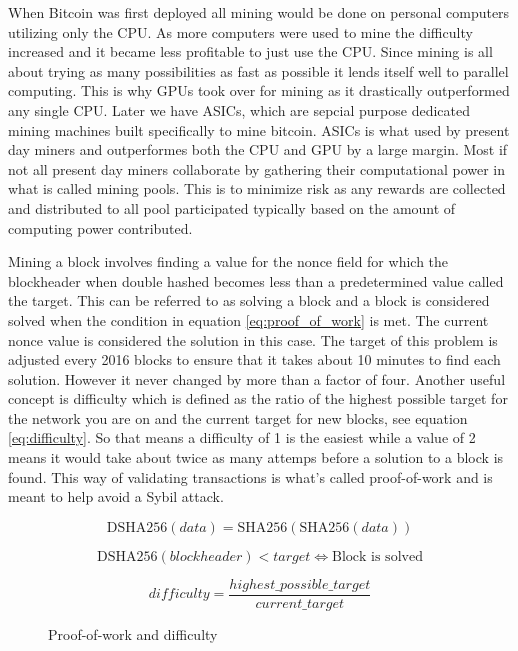 \documentclass[12pt]{article}
\begin{document}
When Bitcoin was first deployed all mining would be done on personal computers utilizing only the CPU. As more computers were used to mine the difficulty increased and it became less profitable to just use the CPU. Since mining is all about trying as many possibilities as fast as possible it lends itself well to parallel computing. This is why GPUs took over for mining as it drastically outperformed any single CPU. Later we have ASICs, which are sepcial purpose dedicated mining machines built specifically to mine bitcoin. ASICs is what used by present day miners and outperformes both the CPU and GPU by a large margin. Most if not all present day miners collaborate by gathering their computational power in what is called mining pools. This is to minimize risk as any rewards are collected and distributed to all pool participated typically based on the amount of computing power contributed. 

Mining a block involves finding a value for the nonce field for which the blockheader when double hashed becomes less than a predetermined value called the target. This can be referred to as solving a block and a block is considered solved when the condition in equation \ref{eq:proof_of_work} is met. The current nonce value is considered the solution in this case. The target of this problem is adjusted every 2016 blocks to ensure that it takes about 10 minutes to find each solution. However it never changed by more than a factor of four\cite{tschorsch2015bitcoin}. Another useful concept is difficulty which is defined as the ratio of the highest possible target for the network you are on and the current target for new blocks, see equation \ref{eq:difficulty}. So that means a difficulty of 1 is the easiest while a value of 2 means it would take about twice as many attemps before a solution to a block is found. This way of validating transactions is what's called proof-of-work and is meant to help avoid a Sybil attack\cite{tschorsch2015bitcoin}.

\begin{figure}[h!]
\begin{equation*}
\textrm{DSHA256}(\mathit{data}) = \textrm{SHA256}(\textrm{SHA256}(\mathit{data}))
\end{equation*}

\begin{equation}\label{eq:proof_of_work}
\textrm{DSHA256}(\mathit{blockheader}) < \mathit{target}
\Leftrightarrow \textrm{Block is solved}
\end{equation}

\begin{equation}\label{eq:difficulty}
\mathit{difficulty} = \frac{\mathit{highest\_possible\_target}}{\mathit{current\_target}}
\end{equation}
\caption{Proof-of-work and difficulty}
\end{figure}
\end{document}
